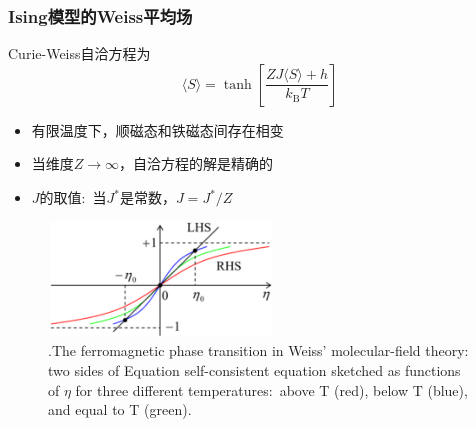 {\frame
{\frametitle{\textrm{Ising}模型的\textrm{Weiss}平均场}
\textrm{Curie-Weiss}自洽方程为
\begin{displaymath}
	\langle S\rangle=\tanh\left[\frac{ZJ\langle S\rangle+h}{k_{\mathrm{B}}T}\right]
\end{displaymath}
\begin{minipage}[t]{0.39\linewidth}
	\vspace*{-2in}
\begin{itemize}
		\setlength{\itemsep}{14pt}
	\item 有限温度下，顺磁态和铁磁态间存在相变
	\item 当维度$Z\rightarrow\infty$，自洽方程的解是精确的
	\item $J$的取值:~当$J^{\ast}$是常数，$J=J^{\ast}/Z$
\end{itemize}
\end{minipage}
\hfill
\begin{minipage}[b]{0.59\linewidth}
\begin{figure}[h!]
\centering
\includegraphics[height=1.2in,width=2.35in,viewport=0 0 1380 720,clip]{Figures/Ferromagnetic_phase_transition-in-Weiss_molecular-field-theory.png}
\caption{\textrm{\tiny .The ferromagnetic phase transition in Weiss' molecular-field theory: two sides of Equation self-consistent equation sketched as functions of $\eta$ for three different temperatures:~above T (red), below T (blue), and equal to T (green).}}%
\label{Ising-Model_Ferromagnetic_phase_transition}
\end{figure}
\end{minipage}
}

}
